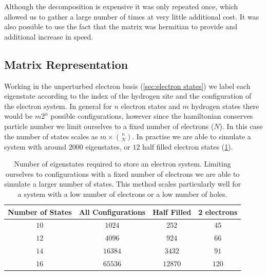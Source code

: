 Although the decomposition is
expensive it was only repeated once,
which allowed us to gather a large
number of times at very little additional
cost. It was also possible to use the
fact that the matrix was hermitian to
provide and additional increase in speed.

\subsection{Matrix Representation}\label{sec:state representation}
Working in the unperturbed electron basis
(\cref{sec:electron states})
we label each eigenstate
according to the index of the
hydrogen site and
the configuration of the
electron system.
In general for \(n\)
electron states
and \(m\) hydrogen states
there would
be \(m 2^n\)
possible configurations,
however since the hamiltonian
conserves particle number
we limit ourselves
to a fixed
number of electrons (\(N\)).
In this case the number
of states scales as \(m \times{} \binom{n}{N}\).
In practise we are able to
simulate a system with
around \(2000\) eigenstates,
or \(12\) half filled electron states
(\cref{tab:number of eigenstates}).
\begin{table}[htbp]
    \begin{center}
        \begin{tabular}{ *{4}{c} }
            \toprule
            Number of States & All Configurations & Half Filled & 2 electrons \\
            \midrule
            \(10\)           & \(1024\)           & \(252\)     & \(45\)      \\
            \(12\)           & \(4096\)           & \(924\)     & \(66\)      \\
            \(14\)           & \(16384\)          & \(3432\)    & \(91\)      \\
            \(16\)           & \(65536\)          & \(12870\)   & \(120\)     \\
            \bottomrule
        \end{tabular}
    \end{center}
    \caption{
        Number of eigenstates required
        to store an electron system.
        Limiting ourselves to
        configurations with a fixed
        number of electrons we are
        able to simulate a larger
        number of states.
        This method scales particularly
        well for a system with a
        low number of electrons
        or a low number of holes.
    }\label{tab:number of eigenstates}
\end{table}

